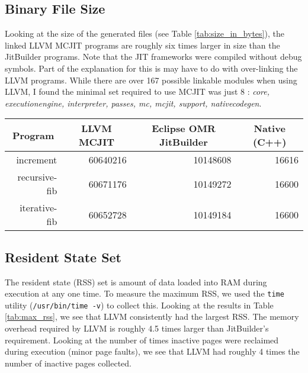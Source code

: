 \subsection{Binary File Size}
Looking at the size of the generated files (see Table \ref{tab:size_in_bytes}), the linked LLVM MCJIT programs are roughly six times larger in size than the JitBuilder programs.
Note that the JIT frameworks were compiled without debug symbols.
Part of the explanation for this is may have to do with over-linking the LLVM programs.
While there are over 167 possible linkable modules when using LLVM, I found the minimal set required to use MCJIT was just 8 : \textit{core, executionengine, interpreter, passes, mc, mcjit, support, nativecodegen}.

\begin{table*}[t]
  \begin{tabular}{|r|l|l|l|} 
  \hline
  \multicolumn{1}{|c|}{\textbf{Program}}
  & \multicolumn{1}{c|}{\textbf{LLVM MCJIT}}                      & \multicolumn{1}{c|}{\textbf{Eclipse OMR JitBuilder}}
  & \multicolumn{1}{c|}{\textbf{Native (C++)}}                    \\ \hline

  increment                               
  & \multicolumn{1}{r|}{\num{60640216}} %
  & \multicolumn{1}{r|}{\num{10148608}} %
  & \multicolumn{1}{r|}{\num{16616}}    %
  \\ \hline
  
  recursive-fib                           
  & \multicolumn{1}{r|}{\num{60671176}} %
  & \multicolumn{1}{r|}{\num{10149272}} %
  & \multicolumn{1}{r|}{\num{16600}}   %
  \\ \hline
  
  iterative-fib                           
  & \multicolumn{1}{r|}{\num{60652728}} %
  & \multicolumn{1}{r|}{\num{10149184}} %
  & \multicolumn{1}{r|}{\num{16600}}   %
  \\ \hline
  
\end{tabular}
  \caption{Total size in bytes of linked binary test programs.}
  \label{tab:size_in_bytes}
\end{table*}

\subsection{Resident State Set}
The resident state (RSS) set is amount of data loaded into RAM during execution at any one time.
To measure the maximum RSS, we used the \texttt{time} utility (\texttt{/usr/bin/time -v}) to collect this.
Looking at the results in Table \ref{tab:max_rss}, we see that LLVM consistently had the largest RSS.
The memory overhead required by LLVM is roughly 4.5 times larger than JitBuilder's requirement.
Looking at the number of times inactive pages were reclaimed during execution (minor page faults), we see that LLVM had roughly 4 times the number of inactive pages collected.

